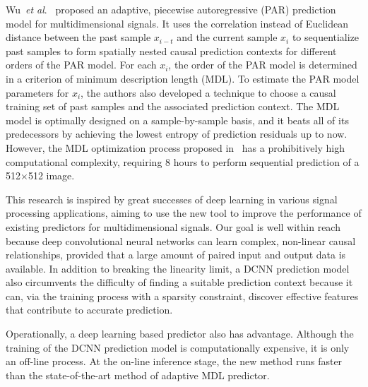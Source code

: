 \documentclass{article}
\newcommand{\etal}{\textit{et al}.}
\begin{document}
Wu~\etal~\cite{MDL-PAR} proposed an adaptive, piecewise autoregressive (PAR) prediction model for multidimensional signals.  It uses the correlation instead of Euclidean distance between the past sample $x_{i-t}$ and the current sample $x_i$ to sequentialize past samples to form spatially nested causal prediction contexts for different orders of the PAR model.
For each $x_i$, the order of the PAR model is determined in a criterion of minimum description length (MDL).  To estimate the PAR model parameters for $x_i$, the authors also developed a technique to choose a causal training set of past samples and the associated prediction context. The MDL model is optimally designed on a sample-by-sample basis, and it beats all of its predecessors by achieving the lowest entropy of prediction residuals up to now.  However, the MDL optimization process proposed in~\cite{MDL-PAR} has a prohibitively high computational complexity, requiring 8 hours to perform sequential prediction of a 512$\times$512 image.

This research is inspired by great successes of deep learning in various signal processing applications, aiming to use the new tool to improve the performance of existing predictors for multidimensional signals.  Our goal is well within reach because deep convolutional neural networks can learn complex, non-linear causal relationships, provided that a large amount of paired input and output data is available.  In addition to breaking the linearity limit, a DCNN prediction model also circumvents the difficulty of finding a suitable prediction context because it can, via the training process with a sparsity constraint, discover effective features that contribute to accurate prediction.

Operationally, a deep learning based predictor also has advantage.  Although the training of the DCNN prediction model is computationally expensive, it is only an off-line process.  At the on-line inference stage, the new method runs faster than the state-of-the-art method of adaptive MDL predictor.


\end{document}
